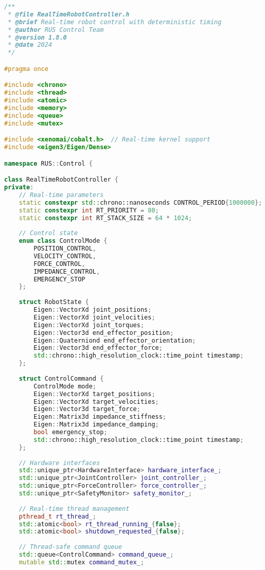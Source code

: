\begin{lstlisting}[language=C++, caption={Real-Time Robot Controller}, label={lst:app-realtime-controller}]
/**
 * @file RealTimeRobotController.h
 * @brief Real-time robot control with deterministic timing
 * @author RUS Control Team
 * @version 1.8.0
 * @date 2024
 */

#pragma once

#include <chrono>
#include <thread>
#include <atomic>
#include <memory>
#include <queue>
#include <mutex>

#include <xenomai/cobalt.h>  // Real-time kernel support
#include <eigen3/Eigen/Dense>

namespace RUS::Control {

class RealTimeRobotController {
private:
    // Real-time parameters
    static constexpr std::chrono::nanoseconds CONTROL_PERIOD{1000000}; // 1 kHz
    static constexpr int RT_PRIORITY = 80;
    static constexpr int RT_STACK_SIZE = 64 * 1024;
    
    // Control state
    enum class ControlMode {
        POSITION_CONTROL,
        VELOCITY_CONTROL,
        FORCE_CONTROL,
        IMPEDANCE_CONTROL,
        EMERGENCY_STOP
    };
    
    struct RobotState {
        Eigen::VectorXd joint_positions;
        Eigen::VectorXd joint_velocities;
        Eigen::VectorXd joint_torques;
        Eigen::Vector3d end_effector_position;
        Eigen::Quaterniond end_effector_orientation;
        Eigen::Vector3d end_effector_force;
        std::chrono::high_resolution_clock::time_point timestamp;
    };
    
    struct ControlCommand {
        ControlMode mode;
        Eigen::VectorXd target_positions;
        Eigen::VectorXd target_velocities;
        Eigen::Vector3d target_force;
        Eigen::Matrix3d impedance_stiffness;
        Eigen::Matrix3d impedance_damping;
        bool emergency_stop;
        std::chrono::high_resolution_clock::time_point timestamp;
    };
    
    // Hardware interfaces
    std::unique_ptr<HardwareInterface> hardware_interface_;
    std::unique_ptr<JointController> joint_controller_;
    std::unique_ptr<ForceController> force_controller_;
    std::unique_ptr<SafetyMonitor> safety_monitor_;
    
    // Real-time thread management
    pthread_t rt_thread_;
    std::atomic<bool> rt_thread_running_{false};
    std::atomic<bool> shutdown_requested_{false};
    
    // Thread-safe command queue
    std::queue<ControlCommand> command_queue_;
    mutable std::mutex command_mutex_;
    

\end{lstlisting}
